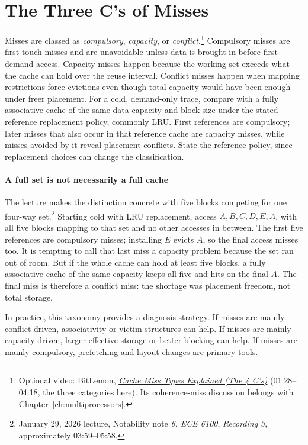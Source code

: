 \section{The Three C's of Misses}\label{sec:auto-025}
Misses are classed as \textit{compulsory}, \textit{capacity}, or \textit{conflict}.\footnote{Optional video: BitLemon, \href{https://youtu.be/YXkfmyb0_eA?t=88}{\emph{Cache Miss Types Explained (The 4 C's)}} (01:28--04:18, the three categories here). Its coherence-miss discussion belongs with Chapter~\ref{ch:multiprocessors}.}
Compulsory misses are first-touch misses and are unavoidable unless data is brought in before first demand access.
Capacity misses happen because the working set exceeds what the cache can hold over the reuse interval.
Conflict misses happen when mapping restrictions force evictions even though total capacity would have been enough under freer placement.
For a cold, demand-only trace, compare with a fully associative cache of the same data capacity and block size under the stated reference replacement policy, commonly LRU.
First references are compulsory; later misses that also occur in that reference cache are capacity misses, while misses avoided by it reveal placement conflicts.
State the reference policy, since replacement choices can change the classification.

\paragraph{A full set is not necessarily a full cache}
The lecture makes the distinction concrete with five blocks competing for one four-way set.\footnote{January 29, 2026 lecture, Notability note \emph{6. ECE 6100}, \emph{Recording 3}, approximately 03:59--05:58.}
Starting cold with LRU replacement, access $A,B,C,D,E,A$, with all five blocks mapping to that set and no other accesses in between.
The first five references are compulsory misses; installing $E$ evicts $A$, so the final access misses too.
It is tempting to call that last miss a capacity problem because the set ran out of room.
But if the whole cache can hold at least five blocks, a fully associative cache of the same capacity keeps all five and hits on the final $A$.
The final miss is therefore a conflict miss: the shortage was placement freedom, not total storage.

In practice, this taxonomy provides a diagnosis strategy.
If misses are mainly conflict-driven, associativity or victim structures can help.
If misses are mainly capacity-driven, larger effective storage or better blocking can help.
If misses are mainly compulsory, prefetching and layout changes are primary tools.

